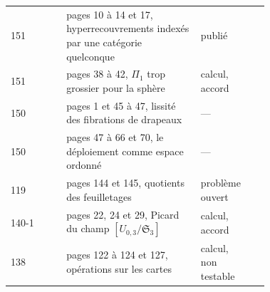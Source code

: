 {\begin{longtable}{@{}l>{\raggedright\arraybackslash}p{0.52\linewidth}>{\raggedright\arraybackslash}p{0.2\linewidth}r@{}}
151 & pages 10 à 14 et 17, hyperrecouvrements indexés par une catégorie quelconque & publié & \pageref{nv:119}\\
151 & pages 38 à 42, $\Pi_1$ trop grossier pour la sphère & calcul, accord & \pageref{nv:120}\\
150 & pages 1 et 45 à 47, lissité des fibrations de drapeaux & --- & \pageref{nv:121}\\
150 & pages 47 à 66 et 70, le déploiement comme espace ordonné & --- & \pageref{nv:122}\\
119 & pages 144 et 145, quotients des feuilletages & problème ouvert & \pageref{nv:123}\\
140-1 & pages 22, 24 et 29, Picard du champ {$[U_{0,3}/\mathfrak S_3]$} & calcul, accord & \pageref{nv:124}\\
138 & pages 122 à 124 et 127, opérations sur les cartes & calcul, non testable & \pageref{nv:125}\\
\bottomrule
\end{longtable}}
